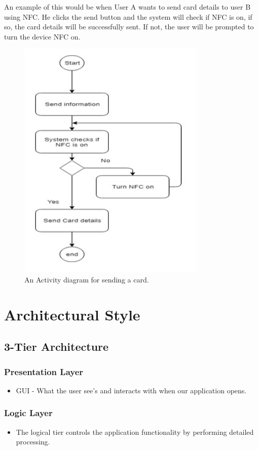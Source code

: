 \documentclass[english]{article}
\begin{document}
		An example of this would be when User A wants to send card details to user B using NFC. He clicks the send button and the system will check if NFC is on, if so, the card details will be successfully sent. If not, the user will be prompted to turn the device NFC on. 
		
		 	\begin{figure}[ht!]
		 		\centering
		 		\includegraphics[width=90mm]{SystemType.PNG}
		 		\caption{An Activity diagram for sending a card.}
		 	\end{figure}
	 	
	 
	
	
	\section{Architectural Style}
	\subsection{3-Tier Architecture}
	\subsubsection{Presentation Layer}
		\begin{itemize}
		\item GUI - What the user see's and interacts with when our application opens.
		\end{itemize}
	
	\subsubsection{Logic Layer}
		\begin{itemize}
			\item 	The logical tier controls the application functionality by performing detailed processing.
		\end{itemize}
\end{document}
